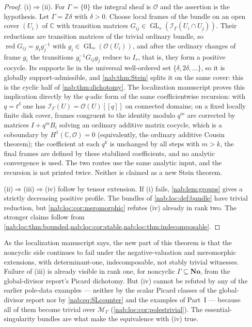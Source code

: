 \documentclass[11pt,letterpaper]{article}
\theoremstyle{definition}
\theoremstyle{remark}
\newcommand{\C}{\mathbb C}
\newcommand{\Z}{\mathbb Z}
\newcommand{\No}{\mathbf{No}}
\newcommand{\OO}{\mathcal O}
\newcommand{\II}{\mathscr I_\Gamma}
\newcommand{\GL}{\operatorname{GL}}
\newcommand{\red}{\operatorname{red}}
\newcommand{\MM}{\mathscr M_\Gamma}
\numberwithin{equation}{section}
\begin{document}
\begin{proof}
(i)$\Rightarrow$(ii). For $\Gamma=\{0\}$ the integral sheaf is $\OO$ and the
assertion is the hypothesis. Let $\Gamma=\Z\delta$ with $\delta>0$. Choose
local frames of the bundle on an open cover $(U_i)$ of $\C$ with transition
matrices $G_{ij}\in\GL_r(\II(U_i\cap U_j))$. Their reductions are transition
matrices of the trivial ordinary bundle, so $\red G_{ij}=g_ig_j^{-1}$ with
$g_i\in\GL_r(\OO(U_i))$, and after the ordinary changes of frame $g_i$ the
transitions $g_i^{-1}G_{ij}g_j$ reduce to $I_r$, that is,
they form a positive cocycle. Its supports lie in the universal well-ordered
set $\{\delta,2\delta,\ldots\}$, so it is globally support-admissible, and
\cref{nab:thm:Stein} splits it on the same cover: this is the cyclic half of
\cref{nab:thm:dichotomy}. The localization manuscript proves this implication
directly by the $q$-adic form of the same coefficientwise recursion: with
$q=t^\delta$ one has $\II(U)=\OO(U)[[q]]$ on connected domains; on a fixed
locally finite disk cover, frames congruent to the identity modulo $q^m$ are
corrected by matrices $I+q^mB_i$ solving an ordinary additive matrix cocycle,
which is a coboundary by $H^1(\C,\OO)=0$ (equivalently, the ordinary additive
Cousin theorem); the coefficient at each $q^k$ is unchanged by all steps with
$m>k$, the final frames are defined by these stabilized coefficients, and no
analytic convergence is used. The two routes use the same analytic input, and
the recursion is not printed twice. Neither is claimed as a new Stein theorem.

(ii)$\Rightarrow$(iii)$\Rightarrow$(iv) follow by tensor extension. If (i)
fails, \cref{nab:lem:groups} gives a strictly decreasing positive profile. The
bundles of \cref{nab:loc:def:bundle} have trivial reduction, but
\cref{nab:loc:cor:meromorphic} refutes (iv) already in rank two. The stronger
claims follow from
\cref{nab:loc:thm:bounded,nab:loc:cor:stable,nab:loc:thm:indecomposable}.
\end{proof}

As the localization manuscript says, the new part of this theorem is that the
noncyclic side continues to fail under the negative-valuation and meromorphic
extensions, with determinant-one, indecomposable, not stably trivial
witnesses. Failure of (iii) is already visible in rank one, for noncyclic
$\Gamma\subseteq\No$, from the global-divisor report's Picard dichotomy. But
(iv) cannot be refuted by any of the earlier pole-data examples --- neither by the scalar Picard classes of
the global-divisor report nor by \eqref{nab:eq:SLcounter} and the examples of
Part~I --- because all of them become trivial over $\MM$
(\cref{nab:loc:cor:polestrivial}). The essential-singularity bundles are what
make the equivalence with (iv) true.
\end{document}
